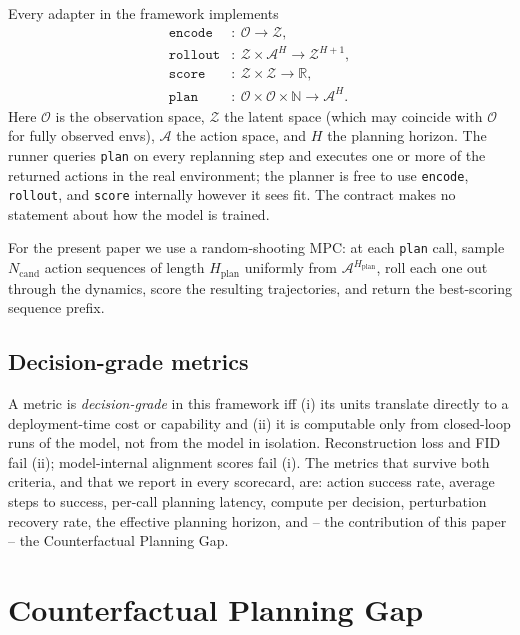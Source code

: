 \documentclass[10pt,letterpaper]{article}
\begin{document}
Every adapter in the framework implements
\begin{align*}
\texttt{encode}    &:\ \mathcal{O} \to \mathcal{Z}, \\
\texttt{rollout}   &:\ \mathcal{Z} \times \mathcal{A}^H \to \mathcal{Z}^{H+1}, \\
\texttt{score}     &:\ \mathcal{Z} \times \mathcal{Z} \to \mathbb{R}, \\
\texttt{plan}      &:\ \mathcal{O} \times \mathcal{O} \times \mathbb{N} \to \mathcal{A}^H.
\end{align*}
Here $\mathcal{O}$ is the observation space, $\mathcal{Z}$ the latent space (which may coincide with $\mathcal{O}$ for fully observed envs), $\mathcal{A}$ the action space, and $H$ the planning horizon. The runner queries \texttt{plan} on every replanning step and executes one or more of the returned actions in the real environment; the planner is free to use \texttt{encode}, \texttt{rollout}, and \texttt{score} internally however it sees fit. The contract makes no statement about how the model is trained.

For the present paper we use a random-shooting MPC: at each \texttt{plan} call, sample $N_{\mathrm{cand}}$ action sequences of length $H_{\mathrm{plan}}$ uniformly from $\mathcal{A}^{H_{\mathrm{plan}}}$, roll each one out through the dynamics, score the resulting trajectories, and return the best-scoring sequence prefix.

\subsection{Decision-grade metrics}

A metric is \emph{decision-grade} in this framework iff (i) its units translate directly to a deployment-time cost or capability and (ii) it is computable only from closed-loop runs of the model, not from the model in isolation. Reconstruction loss and FID fail (ii); model-internal alignment scores fail (i). The metrics that survive both criteria, and that we report in every scorecard, are: action success rate, average steps to success, per-call planning latency, compute per decision, perturbation recovery rate, the effective planning horizon, and -- the contribution of this paper -- the Counterfactual Planning Gap.

\section{Counterfactual Planning Gap}
\label{sec:cpg}
\end{document}
